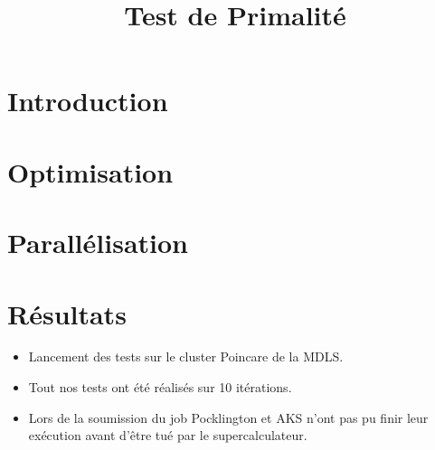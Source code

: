 
\usepackage{../tex/myInfolines}
\usepackage{graphicx}
\usepackage{algorithm}
\usepackage{algorithmic}
\usepackage{subcaption}
\usepackage{longtable,array}
\newenvironment{figure*}%
{\begin{figure}}
{\end{figure}}
\title{Test de Primalité}


	\begin{frame}
		\titlepage
	\end{frame}
	
	\section*{Introduction}
        \begin{frame}
                    
        \end{frame}
	
	\begin{frame}
		\tableofcontents
	\end{frame}
	
	\section{Optimisation}
	\begin{frame}
	
	\end{frame}
	
	\section{Parallélisation}
	\begin{frame}
	
	\end{frame}
	
	\section{Résultats}
	\begin{frame}
		\begin{itemize}
		\item Lancement des tests sur le cluster Poincare de la MDLS. \vspace{2em}
		\item Tout nos tests ont été réalisés sur 10 itérations.\vspace{2em}
		\item Lors de la soumission du job Pocklington et AKS n'ont pas pu finir leur exécution avant d'être tué par le supercalculateur.\\
		\end{itemize}
	\end{frame}		
	

